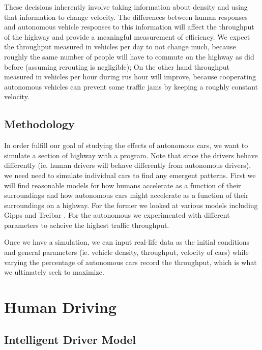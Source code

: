 These decisions inherently involve taking information about density and using that information to change velocity. The differences between human responses and autonomous vehicle responses to this information will affect the throughput of the highway and provide a meaningful measurement of efficiency. We expect the throughput measured in vehicles per day to not change much, because roughly the same number of people will have to commute on the highway as did before (assuming rerouting is negligible); On the other hand throughput measured in vehicles per hour during rus hour will improve, because cooperating autonomous vehicles can prevent some traffic jams by keeping a roughly constant velocity.

\section{Methodology}

In order fulfill our goal of studying the effects of autonomous cars, we want to simulate a section of highway with a program. Note that since the drivers behave differently (ie. human drivers will behave differently from autonomous drivers), we need need to simulate individual cars to find any emergent patterns. First we will find reasonable models for how humans accelerate as a function of their surroundings and how autonomous cars might accelerate as a function of their surroundings on a highway. For the former we looked at various models including Gipps \cite{gipps} and Treibar \cite{treiber}. For the autonomous we experimented with different parameters to acheive the highest traffic throughput.

Once we have a simulation, we can input real-life data as the initial conditions and general parameters (ie. vehicle density, throughput, velocity of cars) while varying the percentage of autonomous cars record the throughput, which is what we ultimately seek to maximize.

\chapter{Human Driving}
\thispagestyle{fancy} %


\section{Intelligent Driver Model}

